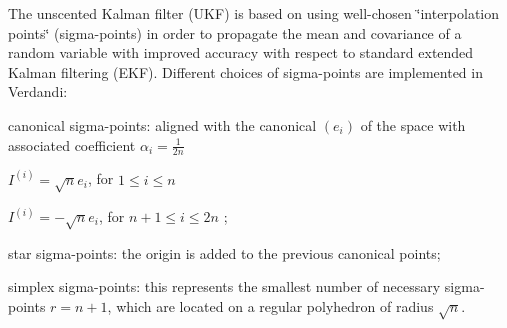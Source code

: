 \documentclass{tufte-book}
\newcounter{points}
\begin{document}
\-The unscented \-Kalman filter (\-U\-K\-F) is based on using well-\/chosen \char`\"{}interpolation points\char`\"{} (sigma-\/points) in order to propagate the mean and covariance of a random variable with improved accuracy with respect to standard extended \-Kalman filtering (\-E\-K\-F). \-Different choices of sigma-\/points are implemented in \-Verdandi\-:
\begin{DoxyEnumerate}
\item canonical sigma-\/points\-: aligned with the canonical $(e_i)$ of the space with associated coefficient $\alpha_i = \frac{1}{2n}$
\begin{DoxyItemize}
\item $I^{(i)} = \sqrt n e_i $, for $1 \le i \le n$ \par

\item $I^{(i)} = - \sqrt n e_i $, for $n + 1 \le i \le 2n $ ;
\end{DoxyItemize}
\item star sigma-\/points\-: the origin is added to the previous canonical points;
\item simplex sigma-\/points\-: this represents the smallest number of necessary sigma-\/points $ r = n + 1 $, which are located on a regular polyhedron of radius $ \sqrt n $.
\end{DoxyEnumerate}
\end{document}
